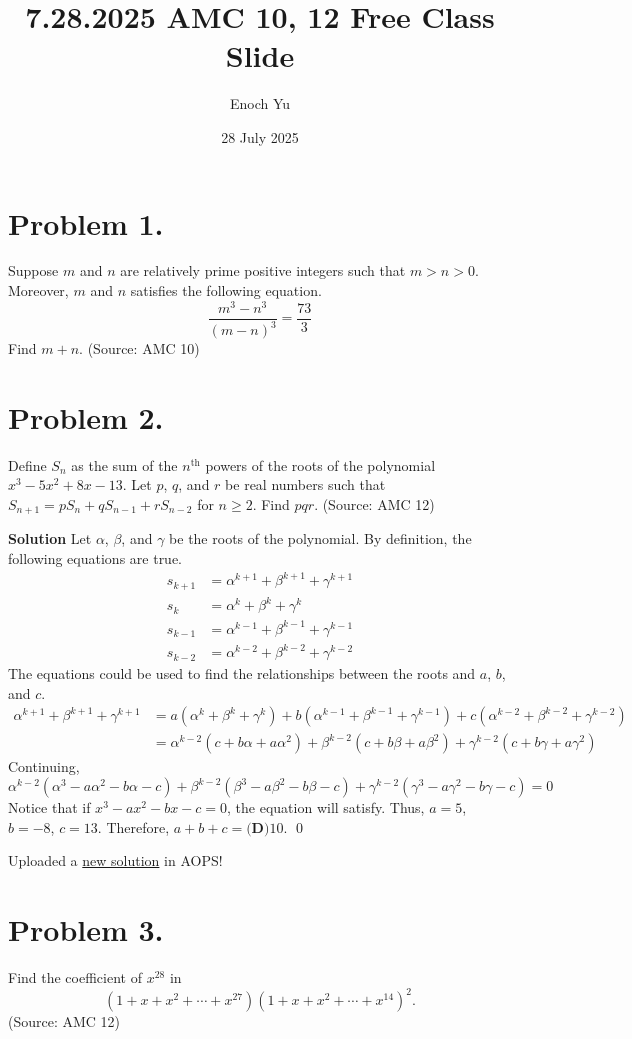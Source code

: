 \documentclass{article}
\title{7.28.2025 AMC 10, 12 Free Class Slide}
\author{Enoch Yu}
\date{28 July 2025}
\newenvironment{solution}{\begin{trivlist}\item[]{\bf Solution}}{\qed \end{trivlist}}
\begin{document}
\section*{Problem 1.} %
Suppose $m$ and $n$ are relatively prime positive
integers such that $m > n > 0$. Moreover, $m$ and $n$
satisfies the following equation.
\[
\frac{m^3 - n^3}{(m - n)^3} = \frac{73}{3}
\]
Find $m + n$. (Source: AMC 10)

\newpage
\section*{Problem 2.} %
Define $S_n$ as the sum of the $n^\text{th}$ powers
of the roots of the polynomial $x^3 - 5x^2 + 8x - 13$.
Let $p$, $q$, and $r$ be real numbers such that
$S_{n+1} = p S_n + q S_{n-1} + r S_{n-2}$ for $n \geq 2$.
Find $pqr$. (Source: AMC 12)

\begin{solution}
Let $\alpha$, $\beta$, and $\gamma$ be the roots of the
polynomial. By definition, the following equations are true.
\begin{align*}
    s_{k + 1} &= \alpha^{k + 1} + \beta^{k + 1} + \gamma^{k + 1} \\
    s_k &= \alpha^k + \beta^k + \gamma^k \\
    s_{k - 1} &= \alpha^{k - 1} + \beta^{k - 1} + \gamma^{k - 1} \\
    s_{k - 2} &= \alpha^{k - 2} + \beta^{k - 2} + \gamma^{k - 2}
\end{align*}
The equations could be used to find the relationships
between the roots and $a$, $b$, and $c$.
\begin{align*}
    \alpha^{k + 1} + \beta^{k + 1} + \gamma^{k + 1}
    &= a(\alpha^k + \beta^k + \gamma^k)
        + b(\alpha^{k - 1} + \beta^{k - 1} + \gamma^{k - 1})
        + c(\alpha^{k - 2} + \beta^{k - 2} + \gamma^{k - 2}) \\
    &= \alpha^{k - 2}(c + b\alpha + a\alpha^2)
        + \beta^{k - 2}(c + b\beta + a\beta^2)
        + \gamma^{k - 2}(c + b\gamma + a\gamma^2)
\end{align*}
Continuing,
\[
\alpha^{k - 2}(\alpha^3 - a\alpha^2 - b\alpha - c) + \beta^{k - 2}(\beta^3 - a\beta^2 - b\beta - c) + \gamma^{k - 2}(\gamma^3 - a\gamma^2 - b\gamma - c) = 0
\]
Notice that if $x^3 - ax^2 - bx - c = 0$, the equation will
satisfy. Thus, $a = 5$, $b = -8$, $c = 13$. Therefore,
$a + b + c = \boxed{\textbf{(D)} 10}$.
\end{solution}

Uploaded a \href{https://artofproblemsolving.com/wiki/index.php/2019_AMC_12A_Problems/Problem_17#Solution_6}{new solution} in AOPS!

\newpage
\section*{Problem 3.} %
Find the coefficient of $x^{28}$ in
\[
\left( 1 + x + x^2 + \cdots + x^{27} \right)
\left( 1 + x + x^2 + \cdots + x^{14} \right)^2.
\]
(Source: AMC 12)
\end{document}
